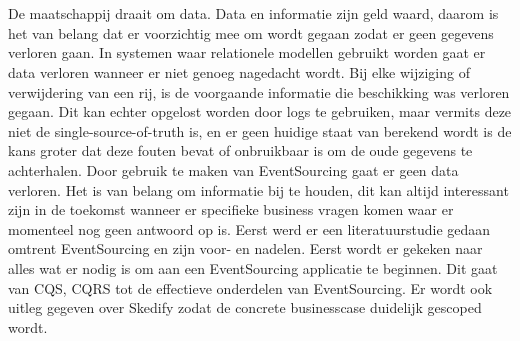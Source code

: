 


\chapter*{}

De maatschappij draait om data. Data en informatie zijn geld waard, daarom is het van belang dat er voorzichtig mee om wordt gegaan zodat er geen gegevens verloren gaan. In systemen waar relationele modellen gebruikt worden gaat er data verloren wanneer er niet genoeg nagedacht wordt. Bij elke wijziging of verwijdering van een rij, is de voorgaande informatie die beschikking was verloren gegaan. Dit kan echter opgelost worden door logs te gebruiken, maar vermits deze niet de single-source-of-truth is, en er geen huidige staat van berekend wordt is de kans groter dat deze fouten bevat of onbruikbaar is om de oude gegevens te achterhalen. Door gebruik te maken van EventSourcing gaat er geen data verloren.
Het is van belang om informatie bij te houden, dit kan altijd interessant zijn in de toekomst wanneer er specifieke business vragen komen waar er momenteel nog geen antwoord op is.
Eerst werd er een literatuurstudie gedaan omtrent EventSourcing en zijn voor- en nadelen.
Eerst wordt er gekeken naar alles wat er nodig is om aan een EventSourcing applicatie te beginnen. Dit gaat van CQS, CQRS tot de effectieve onderdelen van EventSourcing. Er wordt ook uitleg gegeven over Skedify zodat de concrete businesscase duidelijk gescoped wordt.
